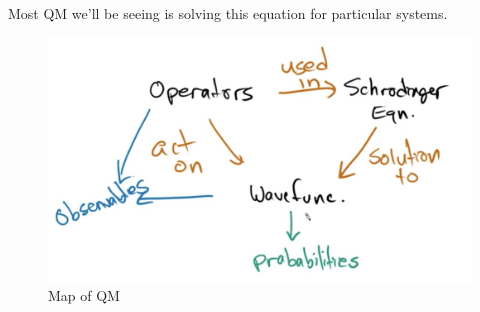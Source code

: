 Most QM we'll be seeing is solving this equation for particular systems.


\begin{figure}[ht!]
	\centering
	\includegraphics[scale=0.3]{./images/lecture_3_figure_1.png}
	\caption{Map of QM}
\end{figure}